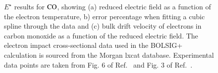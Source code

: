 \begin{figure}[!htbp]
\caption{$E^\star$ results for $\rm CO$, showing (a) reduced electric field as a function of the electron temperature, b) error percentage when fitting a cubic spline through the data and (c) bulk drift velocity of electrons in carbon monoxide as a function of the reduced electric field. The electron impact cross-sectional data used in the BOLSIG+ calculation is sourced from the Morgan lxcat database. Experimental data points are taken from Fig. 6 of Ref.\ \cite{jop:1987:nakamura} and Fig. 3 of Ref.\ \cite{jop:1984:roznerski}.}
\label{fig:electronimpact_CO}
\end{figure}
%



